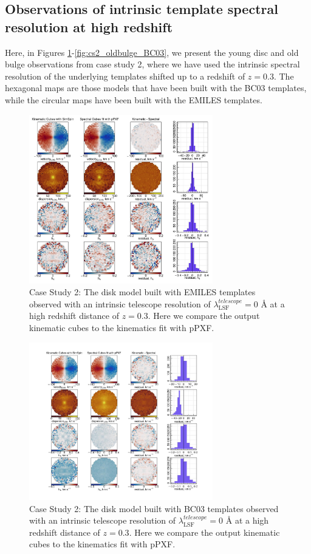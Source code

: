 \documentclass[
  journal=pasa,
  manuscript=research-paper, %
  year=2020,
  volume=37,
]{cup-journal}
\begin{document}
\subsection{Observations of intrinsic template spectral resolution at high redshift}
\label{app:cs2}

Here, in Figures \ref{fig:cs2_disk_EMILES}-\ref{fig:cs2_oldbulge_BC03}, we present the young disc and old bulge observations from case study 2, where we have used the intrinsic spectral resolution of the underlying templates shifted up to a redshift of $z = 0.3$. The hexagonal maps are those models that have been built with the BC03 templates, while the circular maps have been built with the EMILES templates. 

\begin{figure}
    \centering
    \includegraphics[keepaspectratio, width=8cm]{Figures/cs2_disk_velocities_highz_EMILES.jpeg}
    \caption{Case Study 2: The disk model built with EMILES templates observed with an intrinsic telescope resolution of  $\lambda_{\text{LSF}}^{telescope} = 0$ \AA{} at a high redshift distance of $z = 0.3$. Here we compare the output kinematic cubes to the kinematics fit with pPXF.}
    \label{fig:cs2_disk_EMILES}
\end{figure}

\begin{figure}
    \centering
    \includegraphics[keepaspectratio, width=8cm]{Figures/cs2_disk_velocities_highz_BC03hr.jpeg}
    \caption{Case Study 2: The disk model built with BC03 templates observed with an intrinsic telescope resolution of  $\lambda_{\text{LSF}}^{telescope} = 0$ \AA{} at a high redshift distance of $z = 0.3$. Here we compare the output kinematic cubes to the kinematics fit with pPXF.}
    \label{fig:cs2_disk_BC03}
\end{figure}
\end{document}
